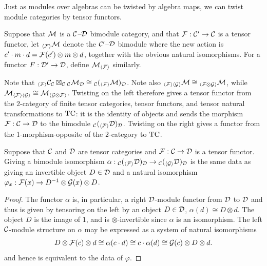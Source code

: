 \documentclass{amsart}
\begin{document}
Just as modules over algebras can be twisted by algebra maps, we can twist module categories by tensor functors.

\begin{definition}
Suppose that $\mathcal M$ is a $\mathcal C$--$\mathcal D$ bimodule category, and that $\mathcal F: \mathcal C' \rightarrow \mathcal C$ is a tensor functor, let
${}_{\langle \mathcal F \rangle} \mathcal M$ denote the $\mathcal C'$--$\mathcal D$ bimodule where the new action is $c' \cdot m \cdot d = \mathcal F(c') \otimes m \otimes d$, together with the obvious natural isomorphisms.  For a functor $F: \mathcal D' \rightarrow \mathcal D$, define $\mathcal M_{\langle \mathcal F \rangle}$ similarly.
\end{definition}

Note that ${}_{\langle \mathcal F \rangle} \mathcal C_\mathcal C \boxtimes_{\mathcal C} {}_{\mathcal C} \mathcal M_\mathcal D \cong {}_{\mathcal C} ({}_{\langle \mathcal F \rangle} \mathcal M)_\mathcal D$.  Note also ${}_{\langle \mathcal F \rangle \langle \mathcal G \rangle} \mathcal M \cong {}_{\langle \mathcal F \otimes \mathcal G \rangle} \mathcal M$, while $\mathcal M_{\langle \mathcal F \rangle \langle \mathcal G \rangle} \cong  \mathcal M_{\langle \mathcal G \otimes \mathcal F \rangle}$.  Twisting on the left therefore gives a tensor functor from the $2$-category of finite tensor categories, tensor functors, and tensor natural transformations to $\mathrm{TC}$: it is the identity of objects and sends the morphism $\mathcal F: \mathcal C \rightarrow \mathcal D$ to the bimodule ${}_{\mathcal C} ({}_{\langle \mathcal F \rangle} \mathcal D)_{\mathcal D}$.  Twisting on the right gives a functor from the 1-morphism-opposite of the $2$-category to $\mathrm{TC}$.

\begin{lemma}
Suppose that $\mathcal C$ and $\mathcal D$ are tensor categories and $\mathcal F: \mathcal C \rightarrow \mathcal D$ is a tensor functor.
Giving a bimodule isomorphism $\alpha:{}_{\mathcal C} ({}_{\langle \mathcal F \rangle} \mathcal D)_\mathcal D \rightarrow {}_{\mathcal C} ({}_{\langle \mathcal G \rangle} \mathcal D)_\mathcal D$ is the same data as giving an invertible object $D \in \mathcal D$ and a natural isomorphism $\varphi_x: \mathcal F(x) \rightarrow D^{-1} \otimes \mathcal G(x) \otimes D$.
\end{lemma}
\begin{proof}
The functor $\alpha$ is, in particular, a right $\mathcal D$-module functor from $\mathcal D$ to $\mathcal D$ and thus is given by tensoring on the left by an object $D \in \mathcal D$, $\alpha(d) \cong D \otimes d$. The object $D$ is the image of $1$, and is $\otimes$-invertible since $\alpha$ is an isomorphism. The left $\mathcal C$-module structure on $\alpha$ may be expressed as a system of natural isomorphisms
\begin{equation*}
	D \otimes \mathcal F(c) \otimes d \cong \alpha (c \cdot d) \cong c \cdot \alpha(d) \cong \mathcal G(c) \otimes D \otimes d.
\end{equation*}
and hence is equivalent to the data of $\varphi$. 
\end{proof}
\end{document}
